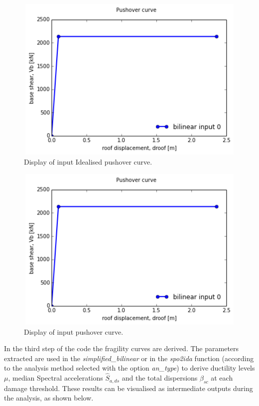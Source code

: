 \begin{figure}[H]
\centering
\includegraphics[width=12cm,height=8cm]{./figures/IdealisedCurve.png}
\caption{Display of input Idealised pushover curve.}
\label{fig:expIdealised}
\end{figure}

\begin{figure}[H]
\centering
\includegraphics[width=12cm,height=8cm]{./figures/IdealisedCurve.png}
\caption{Display of input pushover curve.}
\label{fig:expPushover}
\end{figure}

In the third step of the code the fragility curves are derived. The parameters extracted are used in the \textit{simplified\_bilinear} or in the \textit{spo2ida} function (according to the analysis method selected with the option \textit{an\_type}) to derive ductility levels $\mu$, median Spectral accelerations $\hat{S}_{a,ds}$ and the total dispersions $\beta_{sc}$ at each damage threshold. These results can be visualised as intermediate outputs during the analysis, as shown below.

